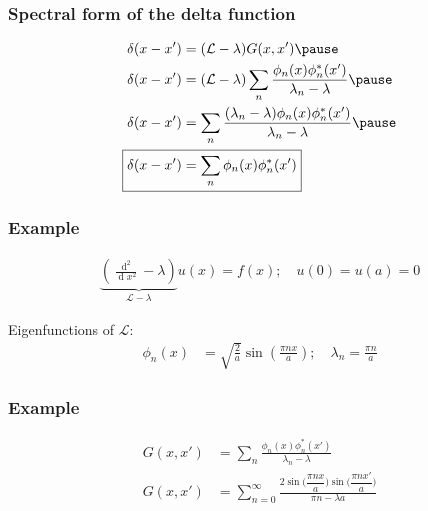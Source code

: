 \documentclass[12 pt, compress, handout, intlimits]{beamer}
\renewcommand{\d}{\operatorname{d}}
\renewcommand{\L}{\mathcal{L}}
\renewcommand{\L}{\mathcal{L}}
\begin{document}
\begin{frame}[fragile]
    \frametitle{Spectral form of the delta function}

    \begin{align*}
        \delta(x - x') &= (\L - \lambda) G(x,x') 
        \pause
        \\
        \delta(x - x') &= (\L - \lambda) \sum_n \frac{\phi_n(x) \phi^*_n(x')}{\lambda_n - \lambda}
        \pause
        \\
        \delta(x - x') &= \sum_n \frac{(\lambda_n - \lambda) \phi_n(x) \phi^*_n(x')}{\lambda_n - \lambda}
        \pause
        \\
        \Aboxed{\delta(x - x') &= \sum_n \phi_n(x) \phi^*_n(x')}
    \end{align*}
    
\end{frame}


\begin{frame}[fragile]
    \frametitle{Example}

    \begin{align*}
        \underbrace{\left( \frac{\d^2}{\d x^2} - \lambda \right)}_{\displaystyle \L - \lambda} u(x) = f(x); \quad u(0) = u(a) = 0
    \end{align*}

    Eigenfunctions of $ \L $:
    \begin{align*}
        \phi_n(x) &= \sqrt{\frac{2}{a}} \sin\left( \frac{\pi n x}{a} \right); \quad \lambda_n = \frac{\pi n}{a}
    \end{align*}
    
\end{frame}

\note{}

\begin{frame}[fragile]
    \frametitle{Example}
    
    \begin{align*}
        G(x,x') &= \sum_n \frac{\phi_n(x) \phi_n^*(x')}{\lambda_n - \lambda}
        \\
        G(x,x') &= \sum_{n=0}^{\infty} \frac{2 \sin\Big( \dfrac{\pi n x}{a} \Big)\sin\Big( \dfrac{\pi n x'}{a} \Big)}{\pi n - \lambda a}
    \end{align*}
    

\end{frame}
\end{document}
